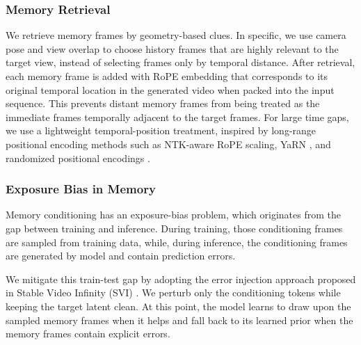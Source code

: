 
\subsubsection{Memory Retrieval}

We retrieve memory frames by geometry-based clues. In specific, we use camera pose and view overlap to choose history frames that are highly relevant to the target view, instead of selecting frames only by temporal distance.
After retrieval, each memory frame is added with RoPE embedding that corresponds to its original temporal location in the generated video when packed into the input sequence.
This prevents distant memory frames from being treated as the immediate frames temporally adjacent to the target frames.
For large time gaps, we use a lightweight temporal-position treatment, inspired
by long-range positional encoding methods such as NTK-aware RoPE scaling, YaRN
\citep{peng2023yarn}, and randomized positional encodings
\citep{ruoss2023randomized}.

\subsubsection{Exposure Bias in Memory}

Memory conditioning has an exposure-bias problem, which originates from the gap between training and inference.
During training, those conditioning frames are sampled from training data, while, during inference, the conditioning frames are generated by model and contain
prediction errors.

We mitigate this train-test gap by adopting the error injection approach proposed in Stable Video Infinity (SVI) \citep{li2025stablevideoinfinity}.
We perturb only the conditioning tokens while keeping the target latent
clean.
At this point, the model learns to draw upon the sampled memory frames when it helps and fall back to its learned prior when the memory frames contain explicit errors.